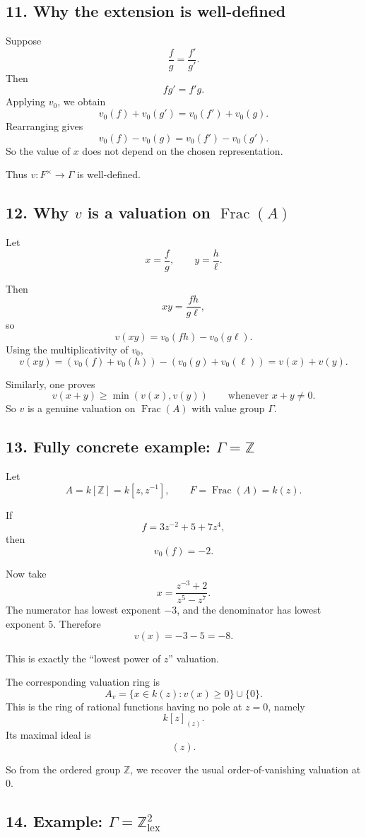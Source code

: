 \documentclass[12pt,a4paper]{article}
\theoremstyle{notespace}
\DeclareMathOperator{\Frac}{Frac}
\begin{document}
\subsection{11. Why the extension is well-defined}

Suppose
\[
\frac{f}{g}=\frac{f'}{g'}.
\]
Then
\[
fg'=f'g.
\]
Applying \(v_0\), we obtain
\[
v_0(f)+v_0(g')=v_0(f')+v_0(g).
\]
Rearranging gives
\[
v_0(f)-v_0(g)=v_0(f')-v_0(g').
\]
So the value of \(x\) does not depend on the chosen representation.

Thus \(v:F^\times\to \Gamma\) is well-defined.

\subsection{12. Why \(v\) is a valuation on \(\Frac(A)\)}

Let
\[
x=\frac{f}{g},
\qquad
y=\frac{h}{\ell}.
\]

Then
\[
xy=\frac{fh}{g\ell},
\]
so
\[
v(xy)=v_0(fh)-v_0(g\ell).
\]
Using the multiplicativity of \(v_0\),
\[
v(xy)=(v_0(f)+v_0(h))-(v_0(g)+v_0(\ell))
=v(x)+v(y).
\]

Similarly, one proves
\[
v(x+y)\ge \min(v(x),v(y))
\qquad
\text{whenever }x+y\neq 0.
\]
So \(v\) is a genuine valuation on \(\Frac(A)\) with value group \(\Gamma\).

\subsection{13. Fully concrete example: \(\Gamma=\mathbb Z\)}

Let
\[
A=k[\mathbb Z]=k[z,z^{-1}],
\qquad
F=\Frac(A)=k(z).
\]

If
\[
f=3z^{-2}+5+7z^4,
\]
then
\[
v_0(f)=-2.
\]

Now take
\[
x=\frac{z^{-3}+2}{z^5-z^7}.
\]
The numerator has lowest exponent \(-3\), and the denominator has lowest exponent \(5\). Therefore
\[
v(x)=-3-5=-8.
\]

This is exactly the ``lowest power of \(z\)'' valuation.

The corresponding valuation ring is
\[
A_v=\{x\in k(z): v(x)\ge 0\}\cup\{0\}.
\]
This is the ring of rational functions having no pole at \(z=0\), namely
\[
k[z]_{(z)}.
\]
Its maximal ideal is
\[
(z).
\]

So from the ordered group \(\mathbb Z\), we recover the usual order-of-vanishing valuation at \(0\).

\subsection{14. Example: \(\Gamma=\mathbb Z^2_{\mathrm{lex}}\)}
\end{document}
